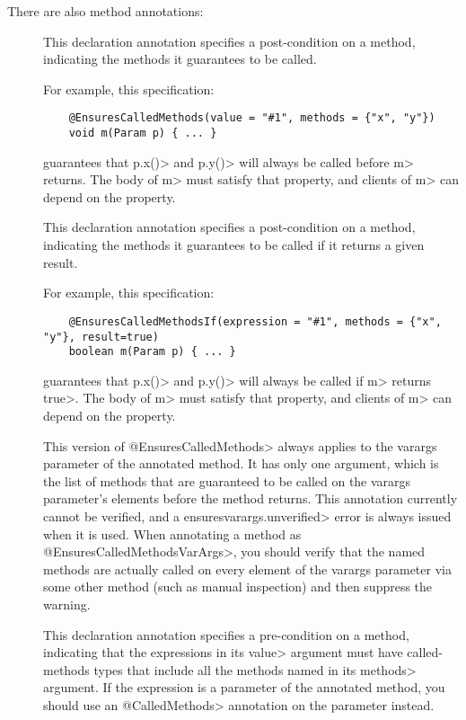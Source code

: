 There are also method annotations:

\begin{description}
\item[]
  This declaration annotation specifies a post-condition on a method, indicating the methods it
  guarantees to be called.

  For example, this specification:

  \begin{Verbatim}
    @EnsuresCalledMethods(value = "#1", methods = {"x", "y"})
    void m(Param p) { ... }
  \end{Verbatim}

  guarantees that \<p.x()> and \<p.y()> will always be called before \<m> returns.
  The body of \<m> must satisfy that property, and clients of \<m> can depend on the property.

\item[]
  This declaration annotation specifies a post-condition on a method, indicating the methods it
  guarantees to be called if it returns a given result.

  For example, this specification:

  \begin{Verbatim}
    @EnsuresCalledMethodsIf(expression = "#1", methods = {"x", "y"}, result=true)
    boolean m(Param p) { ... }
  \end{Verbatim}

  guarantees that \<p.x()> and \<p.y()> will always be called if \<m> returns \<true>.
  The body of \<m> must satisfy that property, and clients of \<m> can depend on the property.

\item[]
  This version of \<@EnsuresCalledMethods> always applies to the varargs parameter of the
  annotated method. It has only one argument, which is the list of methods that are guaranteed
  to be called on the varargs parameter's elements before the method returns. This annotation
  currently cannot be verified, and a \<ensuresvarargs.unverified> error is always issued
  when it is used. When annotating a method as \<@EnsuresCalledMethodsVarArgs>, you should verify
  that the named methods are actually called on every element of the varargs parameter via some
  other method (such as manual inspection) and then suppress the warning.

\item[]
  This declaration annotation specifies a pre-condition on a method, indicating that the expressions
  in its \<value> argument must have called-methods types that include all the methods named
  in its \<methods> argument. If the expression is a parameter of the annotated method, you should
  use an \<@CalledMethods> annotation on the parameter instead.

\end{description}

